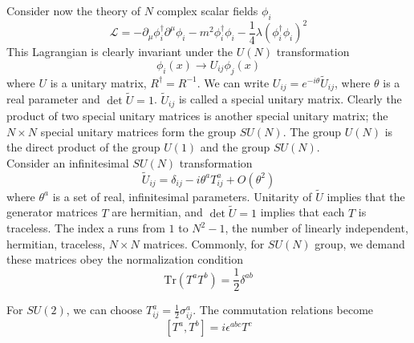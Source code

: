 \documentclass[cyan]{elegantnote}
\begin{document}
\noindent
Consider now the theory of $N$ complex scalar fields $\phi_i$
\[\mathcal{L} = -\partial_{\mu}\phi^{\dagger}_i \partial^{\mu}\phi_i - m^2\phi_i^{\dagger}\phi_i - \frac{1}{4}\lambda(\phi_i^{\dagger}\phi_i)^2\]
This Lagrangian is clearly invariant under the $U(N)$ transformation
\[\phi_i(x) \to U_{ij}\phi_j(x)\]
where $U$ is a unitary matrix, $R^{\dagger} = R^{-1}$. We can write $U_{ij} = e^{-i\theta} \widetilde{U}_{ij}$, where $\theta$ is a real parameter and $\det \widetilde{U} = 1$.
$\widetilde{U}_{ij}$ is called a special unitary matrix.
Clearly the product of two special unitary matrices is another special unitary matrix; the $N \times N$ special unitary matrices form the group $SU(N)$. 
The group $U(N)$ is the direct product of the group $U(1)$ and the group $SU(N)$.\\
Consider an infinitesimal $SU(N)$ transformation
\[\widetilde{U}_{ij} = \delta_{ij} - i\theta^aT^a_{ij} + O(\theta^2)\]
where $\theta^a$ is a set of real, infinitesimal parameters. Unitarity of $\widetilde{U}$ implies that the generator matrices $T$ are hermitian, and $\det \widetilde{U} = 1$ implies that each $T$ is traceless.
The index a runs from $1$ to $N^2 - 1$, the number of linearly independent, hermitian, traceless, $N \times N$ matrices. Commonly, for $SU(N)$ group, we demand these matrices obey the normalization condition
\[\mathrm{Tr}(T^a T^b) =\frac{1}{2}\delta^{ab}\]

\begin{example}
For $SU(2)$, we can choose $T^a_{ij} = \frac{1}{2}\sigma^a_{ij}$. The commutation relations become
\[[T^a,T^b] = i\epsilon^{abc}T^c\]
\end{example}
\end{document}
